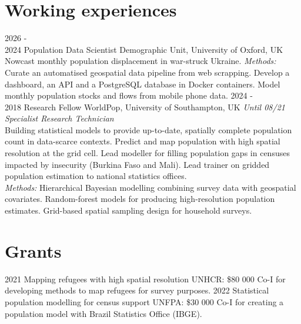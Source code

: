 \documentclass[
]{friggeri-cv}
\begin{document}
\section{Working experiences}
\begin{entrylist}
\entry
{2026 - \\ 2024}
{Population Data Scientist}
{Demographic Unit, University of Oxford, UK}
{Nowcast monthly population displacement in war-struck Ukraine.
\textit{Methods:} Curate an automatised geospatial data pipeline from web scrapping. Develop a dashboard, an API and a PostgreSQL database in Docker containers. Model monthly population stocks and flows from mobile phone data.}
\entry
{2024 - \\ 2018}
{Research Fellow}
{WorldPop, University of Southampton, UK}
{\textit{Until 08/21 Specialist Research Technician}\\
Building statistical models to provide up-to-date, spatially complete population count in data-scarce contexts. Predict and map population with high spatial resolution at the grid cell.   Lead modeller for filling population gaps in censuses impacted by insecurity (Burkina Faso and Mali). Lead trainer on gridded population estimation to national statistics offices. \\
\textit{Methods:} Hierarchical Bayesian modelling combining survey data with geospatial covariates. Random-forest models for producing high-resolution population estimates. Grid-based spatial sampling design for household surveys.
}
\end{entrylist}

\section{Grants}
\begin{entrylist}
\entry
{2021}
{Mapping refugees with high spatial resolution}
{UNHCR: \$80 000}
{Co-I for developing methods to map refugees for survey purposes.}
\entry
{2022}
{Statistical population modelling for census support}
{UNFPA: \$30 000}
{Co-I for creating a population model with Brazil Statistics Office (IBGE).}
\end{entrylist}
\end{document}
